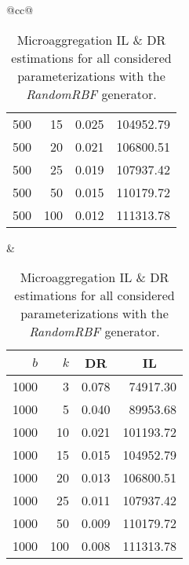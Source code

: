 \begin{table}[H]
\begin{tabular}{@{}cc@{}}
\begin{tabular}{@{}rrrr@{}}
			500  & 15  & 0.025 & 104952.79 \\
			500  & 20  & 0.021 & 106800.51 \\
			500  & 25  & 0.019 & 107937.42 \\
			500  & 50  & 0.015 & 110179.72 \\
			500  & 100 & 0.012 & 111313.78 \\ \bottomrule
		\end{tabular}
		&
		\begin{tabular}{@{}rrrr@{}}
			\toprule
			$b$ & $k$ & \multicolumn{1}{c}{DR} & \multicolumn{1}{c}{IL} \\ \midrule
			1000 & 3   & 0.078 & 74917.30  \\
			1000 & 5   & 0.040 & 89953.68  \\
			1000 & 10  & 0.021 & 101193.72 \\
			1000 & 15  & 0.015 & 104952.79 \\
			1000 & 20  & 0.013 & 106800.51 \\
			1000 & 25  & 0.011 & 107937.42 \\
			1000 & 50  & 0.009 & 110179.72 \\
			1000 & 100 & 0.008 & 111313.78 \\ \bottomrule
		\end{tabular}
	\end{tabular}
	\caption[Microaggregation DR \& IL estimations (RandomRBF).]{Microaggregation IL \& DR estimations for all considered parameterizations with the \textit{RandomRBF} generator.}
\end{table}

